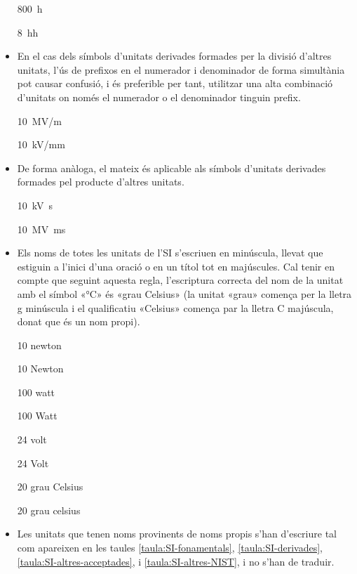\begin{itemize}
\textcolor{Green}\faCheckSquare{} \qty{800}{h}

\textcolor{Red}\faTimesCircle{}  \qty{8}{hh}


\item En el cas dels símbols d'unitats derivades formades per la divisió
d'altres unitats, l'ús de prefixos en el numerador i denominador de
forma simultània pot causar confusió, i és preferible per tant,
utilitzar una alta combinació d'unitats on només el numerador o el
denominador tinguin prefix.

\textcolor{Green}\faCheckSquare{} \qty{10}{MV/m}

\textcolor{Blue}\faExclamationTriangle{}  \qty{10}{kV/mm}


\item De forma anàloga, el mateix és aplicable als símbols d'unitats
derivades formades pel producte d'altres unitats.

\textcolor{Green}\faCheckSquare{} \qty{10}{kV.s}

\textcolor{Blue}\faExclamationTriangle{}  \qty{10}{MV.ms}


\item Els noms de totes les unitats de l'SI s'escriuen en minúscula, llevat que estiguin a l'inici d'una oració o en un títol tot en majúscules. Cal tenir en compte que seguint aquesta regla, l'escriptura  correcta
del nom de la unitat amb el símbol «\unit{\degreeCelsius}» és «grau Celsius» (la unitat  «grau» comença per la lletra g  minúscula i el qualificatiu «Celsius» comença par la lletra C  majúscula, donat que és un nom propi).


\textcolor{Green}\faCheckSquare{} 10 newton

\textcolor{Red}\faTimesCircle{} 10 Newton

\textcolor{Green}\faCheckSquare{}  100 watt

\textcolor{Red}\faTimesCircle{} 100 Watt

\textcolor{Green}\faCheckSquare{}  24 volt

\textcolor{Red}\faTimesCircle{} 24 Volt

\textcolor{Green}\faCheckSquare{}  20 grau Celsius

\textcolor{Red}\faTimesCircle{} 20 grau celsius


\item Les unitats que tenen noms provinents de noms propis s'han
d'escriure tal com apareixen en les taules
\vref{taula:SI-fonamentals}, \vref{taula:SI-derivades}, \vref{taula:SI-altres-acceptades}, i \vref{taula:SI-altres-NIST}, i no s'han de traduir.


\end{itemize}
